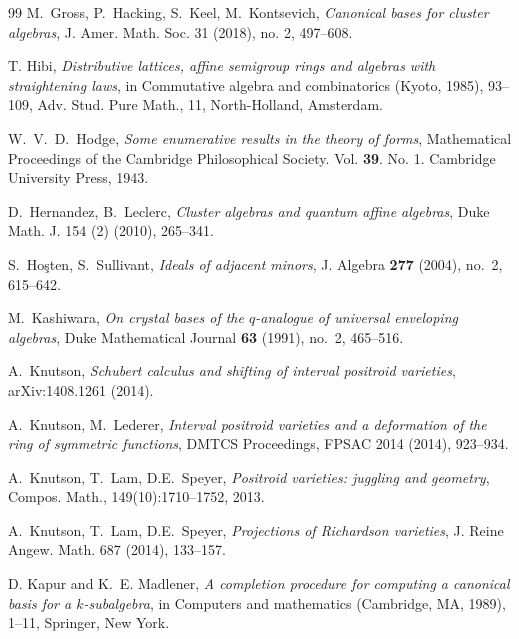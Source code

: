 \documentclass[11pt]{amsart}
\numberwithin{equation}{section}
\begin{document}
\begin{thebibliography}{99}
M.~Gross, P.~Hacking, S.~Keel, M.~Kontsevich, 
\emph{Canonical bases for cluster algebras}, J. Amer. Math.
Soc. 31 (2018), no. 2, 497--608.



 T. Hibi, \emph{Distributive lattices, affine semigroup rings and algebras with straightening laws}, in Commutative algebra and combinatorics (Kyoto, 1985), 93--109, Adv. Stud. Pure Math., 11, North-Holland, Amsterdam.


 W.~V.~D.~Hodge, \textit{Some enumerative results in the theory of forms}, Mathematical Proceedings of the Cambridge Philosophical Society. Vol. \textbf{39}. No. 1. Cambridge University Press, 1943.

D.~Hernandez, B.~Leclerc, 
\emph{Cluster algebras and quantum affine algebras}, Duke Math. J. 154 (2)
(2010), 265--341.


S.~Ho\c{s}ten, S.~Sullivant,
\emph{Ideals of adjacent minors},
J. Algebra \textbf{277} (2004), no.~2, 615--642.

M.~Kashiwara, \emph{On crystal bases of the $q$-analogue of universal enveloping algebras}, 
Duke Mathematical Journal {\bf 63} (1991), no.~2, 465--516.


A.~Knutson, \emph{Schubert calculus and shifting of interval positroid varieties}, arXiv:1408.1261 (2014).


A.~Knutson,  M.~Lederer, 
\emph{Interval positroid varieties and a deformation of the ring of symmetric functions}, 
DMTCS Proceedings, FPSAC 2014 (2014), 923--934.


 A.~Knutson, T.~Lam, D.E.~Speyer, \emph{Positroid varieties:  juggling and geometry}, Compos. Math., 149(10):1710--1752, 2013.

 A.~Knutson, T.~Lam, D.E.~Speyer, 
\emph{Projections of Richardson varieties}, J. Reine Angew. Math. 687 (2014), 133--157.

 D. Kapur and K.~E. Madlener, \emph{A completion procedure for computing a canonical basis for a $k$-subalgebra}, in Computers and mathematics (Cambridge, MA, 1989), 1--11, Springer, New York.


\end{thebibliography}
\end{document}

